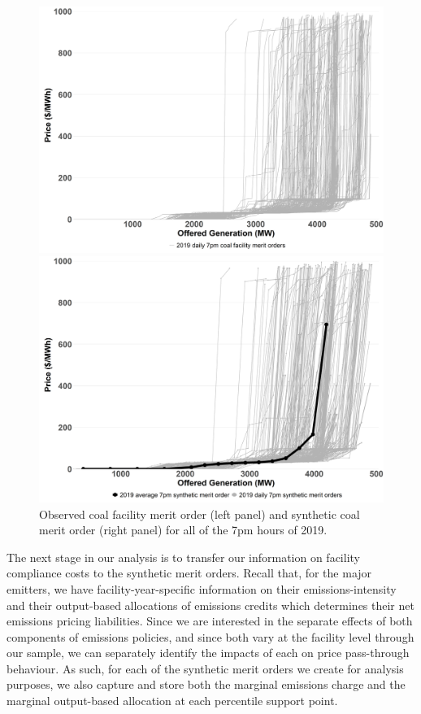 \documentclass[12pt]{article}
\begin{document}
\begin{figure}[!htb]
    \centering
    \begin{minipage}{.5\textwidth}
        \centering
        \includegraphics[width=.9\textwidth]{../images/all_coal_merit.png}
    \end{minipage}%
    \begin{minipage}{0.5\textwidth}
        \centering
        \includegraphics[width=.9\textwidth]{../images/coal_synth_2019}
    \end{minipage}
    \caption{Observed coal facility merit order (left panel) and synthetic coal merit order (right panel) for all of the 7pm hours of 2019.}
    \label{fig:synth_coal_2019}
\end{figure}


The next stage in our analysis is to transfer our information on facility compliance costs to the synthetic merit orders. Recall that, for the major emitters, we have facility-year-specific information on their emissions-intensity and their output-based allocations of emissions credits which determines their net emissions pricing liabilities. Since we are interested in the separate effects of both components of emissions policies, and since both vary at the facility level through our sample, we can separately identify the impacts of each on price pass-through behaviour. As such, for each of the synthetic merit orders we create for analysis purposes, we also capture and store both the marginal emissions charge and the marginal output-based allocation at each percentile support point.
\end{document}
